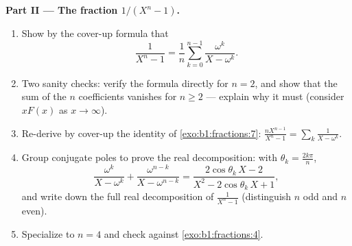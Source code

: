 \begin{problem}
\medskip
\noindent\textbf{Part II --- The fraction $1/(X^n - 1)$.}
\begin{enumerate}[resume]
  \item Show by the cover-up formula that
        \[
        \frac{1}{X^n - 1}
        = \frac1n\sum_{k=0}^{n-1}\frac{\omega^k}{X - \omega^k} .
        \]
  \item Two sanity checks: verify the formula directly for $n =
        2$, and show that the sum of the $n$ coefficients
        vanishes for $n \geq 2$ --- explain why it must (consider
        $xF(x)$ as $x \to \infty$).
  \item Re-derive by cover-up the identity of
        \cref{exo:b1:fractions:7}:
        $\frac{nX^{n-1}}{X^n-1} = \sum_k \frac1{X - \omega^k}$.
  \item Group conjugate poles to prove the real decomposition:
        with $\theta_k = \frac{2k\pi}n$,
        \[
        \frac{\omega^k}{X - \omega^k} +
        \frac{\omega^{n-k}}{X - \omega^{n-k}}
        = \frac{2\cos\theta_k\,X - 2}
        {X^2 - 2\cos\theta_k\,X + 1} ,
        \]
        and write down the full real decomposition of
        $\frac1{X^n-1}$ (distinguish $n$ odd and $n$ even).
  \item Specialize to $n = 4$ and check against
        \cref{exo:b1:fractions:4}.
\end{enumerate}


\end{problem}
